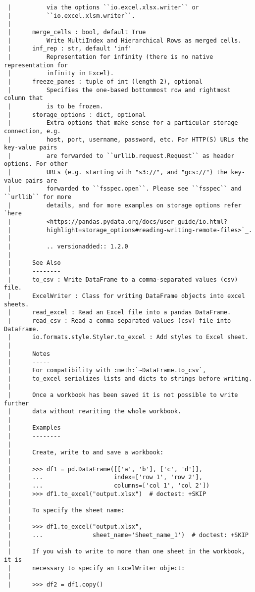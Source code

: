 \documentclass[
  letterpaper,
  DIV=11,
  numbers=noendperiod]{scrreprt}
\begin{document}
\begin{verbatim}
 |          via the options ``io.excel.xlsx.writer`` or
 |          ``io.excel.xlsm.writer``.
 |      
 |      merge_cells : bool, default True
 |          Write MultiIndex and Hierarchical Rows as merged cells.
 |      inf_rep : str, default 'inf'
 |          Representation for infinity (there is no native representation for
 |          infinity in Excel).
 |      freeze_panes : tuple of int (length 2), optional
 |          Specifies the one-based bottommost row and rightmost column that
 |          is to be frozen.
 |      storage_options : dict, optional
 |          Extra options that make sense for a particular storage connection, e.g.
 |          host, port, username, password, etc. For HTTP(S) URLs the key-value pairs
 |          are forwarded to ``urllib.request.Request`` as header options. For other
 |          URLs (e.g. starting with "s3://", and "gcs://") the key-value pairs are
 |          forwarded to ``fsspec.open``. Please see ``fsspec`` and ``urllib`` for more
 |          details, and for more examples on storage options refer `here
 |          <https://pandas.pydata.org/docs/user_guide/io.html?
 |          highlight=storage_options#reading-writing-remote-files>`_.
 |      
 |          .. versionadded:: 1.2.0
 |      
 |      See Also
 |      --------
 |      to_csv : Write DataFrame to a comma-separated values (csv) file.
 |      ExcelWriter : Class for writing DataFrame objects into excel sheets.
 |      read_excel : Read an Excel file into a pandas DataFrame.
 |      read_csv : Read a comma-separated values (csv) file into DataFrame.
 |      io.formats.style.Styler.to_excel : Add styles to Excel sheet.
 |      
 |      Notes
 |      -----
 |      For compatibility with :meth:`~DataFrame.to_csv`,
 |      to_excel serializes lists and dicts to strings before writing.
 |      
 |      Once a workbook has been saved it is not possible to write further
 |      data without rewriting the whole workbook.
 |      
 |      Examples
 |      --------
 |      
 |      Create, write to and save a workbook:
 |      
 |      >>> df1 = pd.DataFrame([['a', 'b'], ['c', 'd']],
 |      ...                    index=['row 1', 'row 2'],
 |      ...                    columns=['col 1', 'col 2'])
 |      >>> df1.to_excel("output.xlsx")  # doctest: +SKIP
 |      
 |      To specify the sheet name:
 |      
 |      >>> df1.to_excel("output.xlsx",
 |      ...              sheet_name='Sheet_name_1')  # doctest: +SKIP
 |      
 |      If you wish to write to more than one sheet in the workbook, it is
 |      necessary to specify an ExcelWriter object:
 |      
 |      >>> df2 = df1.copy()

\end{verbatim}
\end{document}
